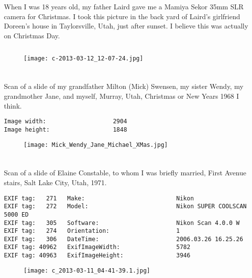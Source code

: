 
\clearpage
\section{\protect{}}
\noindent When I was 18 years old, my father Laird gave me a Mamiya Sekor 35mm SLR camera for Christmas. I took this picture in the back yard of Laird's girlfriend Doreen's house in Taylorsville, Utah, just after sunset. I believe this was actually on Christmas Day.
\noindent
\begin{lstlisting}

\end{lstlisting}
\clearpage
\begin{figure}
\raggedleft
\texttt{[image: c-2013-03-12\_12-07-24.jpg]}
\end{figure}


\clearpage
\section{\protect{}}
\noindent Scan of a slide of my grandfather Milton (Mick) Swensen, my sister Wendy, my grandmother Jane, and myself, Murray, Utah, Christmas or New Years 1968 I think.
\noindent
\begin{lstlisting}
Image width:                   2904
Image height:                  1848

\end{lstlisting}
\clearpage
\begin{figure}
\raggedleft
\texttt{[image: Mick\_Wendy\_Jane\_Michael\_XMas.jpg]}
\end{figure}


\clearpage
\section{\protect{}}
\noindent Scan of a slide of Elaine Constable, to whom I was briefly married, First Avenue stairs, Salt Lake City, Utah, 1971.
\noindent
\begin{lstlisting}
EXIF tag:   271   Make:                          Nikon
EXIF tag:   272   Model:                         Nikon SUPER COOLSCAN 5000 ED
EXIF tag:   305   Software:                      Nikon Scan 4.0.0 W
EXIF tag:   274   Orientation:                   1
EXIF tag:   306   DateTime:                      2006.03.26 16.25.26
EXIF tag: 40962   ExifImageWidth:                5782
EXIF tag: 40963   ExifImageHeight:               3946

\end{lstlisting}
\clearpage
\begin{figure}
\raggedleft
\texttt{[image: c\_2013-03-11\_04-41-39.1.jpg]}
\end{figure}


